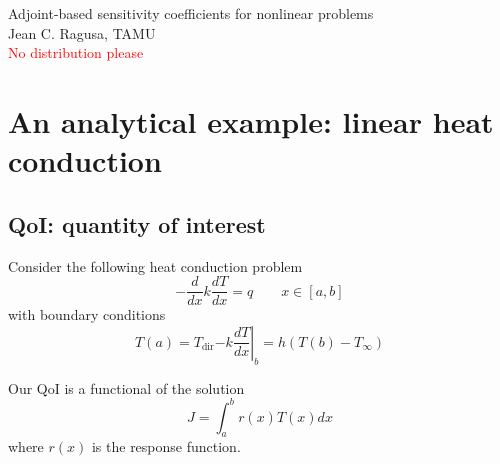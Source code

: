 \documentclass[11pt]{article}
\newcommand{\be}{\begin{equation}}
\newcommand{\ee}{\end{equation}}
\begin{document}

\begin{center}
{\huge Adjoint-based sensitivity coefficients for nonlinear problems}\\
{\Large Jean C. Ragusa, TAMU}\\
{\Large \textcolor{red}{No distribution please}}\\
\end{center}

\tableofcontents
\pagebreak

\section{An analytical example: linear heat conduction}

\subsection{QoI: quantity of interest}

Consider the following heat conduction problem
\be
\label{eq:ex_heat_conduction}
-\frac{d}{dx}k\frac{dT}{dx}=q \qquad x\in [a,b]
\ee
with boundary conditions
\begin{subequations}
\label{eq:ex_heat_conduction_bc}
\be
T(a) = T_{\text{dir}} 
\ee
\be
-k \left.\frac{dT}{dx}\right|_b = h(T(b)-T_{\infty})
\ee
\end{subequations}

Our QoI is a functional of the solution
\be
\label{eq:ex_heat_conduction_qoi}
J = \int_a^b r(x) T(x) dx
\ee
where $r(x)$ is the response function.
\end{document}
